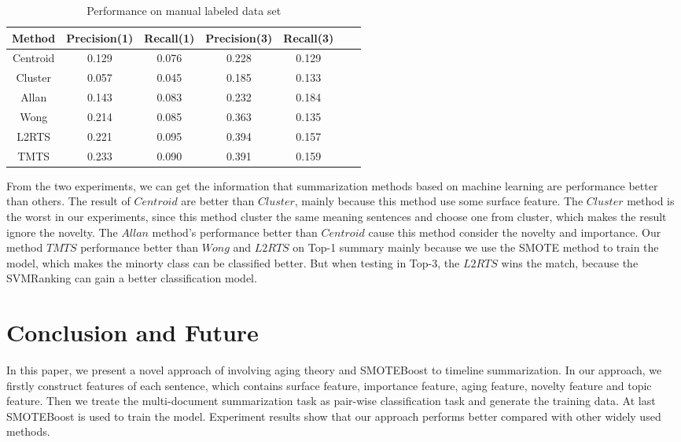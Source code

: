 \documentclass{llncs}
\begin{document}
\begin{table}
\caption{Performance on manual labeled data set}
\begin{tabular}{|c|c|c|c|c|c|c|}
\hline
Method  & Precision(1) & Recall(1)  & Precision(3) & Recall(3) \\
\hline
Centroid &	0.129			& 		0.076	 			&	0.228			& 0.129			 				\\
\hline
Cluster	&	0.057			&		0.045				&	0.185			& 	0.133		 				\\
\hline
Allan		&	0.143			&		0.083				&	0.232			& 0.184			 				\\
\hline
Wong		&	0.214			&		0.085				&	0.363			& 0.135							\\
\hline
L2RTS	&	0.221			&		0.095				&	0.394			& 0.157			 				\\
\hline
TMTS	&	0.233			&		0.090				&	0.391			& 0.159							\\
\hline
\end{tabular}
\end{table}

From the two experiments, we can get the information that summarization methods based on machine learning are performance better than others. The result of $Centroid$ are better than $Cluster$, mainly because this method use some surface feature. The $Cluster$ method is the worst in our experiments, since this method cluster the same meaning sentences and choose one from cluster, which makes the result ignore the novelty. The $Allan$ method's performance better than $Centroid$ cause this method consider the novelty and importance. Our method $TMTS$ performance better than $Wong$ and $L2RTS$ on Top-1 summary mainly because we use the SMOTE method to train the model, which makes the minorty class can be classified better. But when testing in Top-3, the $L2RTS$ wins the match, because the SVMRanking can gain a better classification model.

%
\section{Conclusion and Future}
%

In this paper, we present a novel approach of involving aging theory and SMOTEBoost to timeline summarization. In our approach, we firstly construct features of each sentence, which contains surface feature, importance feature, aging feature, novelty feature and topic feature. Then we treate the multi-document summarization task as pair-wise classification task and generate the training data. At last SMOTEBoost is used to train the model. Experiment results show that our approach performs better compared with other widely used methods.
\end{document}

